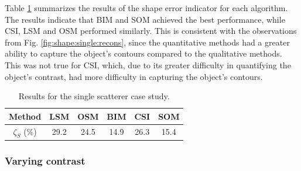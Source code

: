 \documentclass{IEEEtran}
\begin{document}
                Table \ref{tab:star} summarizes the results of the shape error indicator for each algorithm. The results indicate that BIM and SOM achieved the best performance, while CSI, LSM and OSM performed similarly. This is consistent with the observations from Fig. \ref{fig:shape:single:recons}, since the quantitative methods had a greater ability to capture the object's contours compared to the qualitative methods. This was not true for CSI, which, due to its greater difficulty in quantifying the object's contrast, had more difficulty in capturing the object's contours.           

                \begin{table}[!t]
                    \centering
                    \renewcommand{\arraystretch}{1.5}
                    \caption{Results for the single scatterer case study.}
                    \label{tab:star}
                    \begin{tabular}{cccccc}
                        Method & LSM & OSM & BIM & CSI & SOM \\\hline
                        $\zeta_S$ (\%) & 29.2 & 24.5 & 14.9 & 26.3 & 15.4 \\
                    \end{tabular}   
                \end{table}
			
			\subsubsection{Varying contrast}\label{sec:results:shape:varying}
\end{document}
